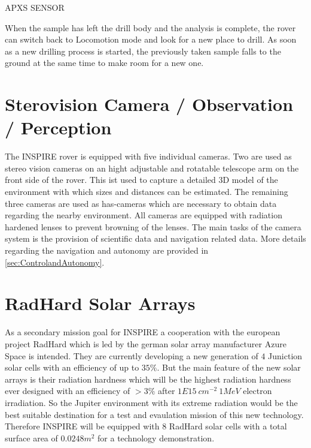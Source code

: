APXS SENSOR

When the sample has left the drill body and the analysis is complete, the rover can switch back to Locomotion mode and look for a new place to drill. As soon as a new drilling process is started, the previously taken sample falls to the ground at the same time to make room for a new one.

\section{Sterovision Camera / Observation / Perception}

The INSPIRE rover is equipped with five individual cameras. Two are used as stereo vision cameras on an hight adjustable and rotatable telescope arm on the front side of the rover. This ist used to capture a detailed 3D model of the environment with which sizes and distances can be estimated. The remaining three cameras are used as has-cameras which are necessary to obtain data regarding the nearby environment. All cameras are equipped with radiation hardened lenses to prevent browning of the lenses. The main tasks of the camera system is the provision of scientific data and navigation related data. More details regarding the navigation and autonomy are provided in \autoref{sec:ControlandAutonomy}.

\section{RadHard Solar Arrays}
\label{subsec:radhard}
As a secondary mission goal for INSPIRE a cooperation with the european project RadHard which is led by the german solar array manufacturer Azure Space is intended. They are currently developing a new generation of $4$ Juniction solar cells with an efficiency of up to $35 \% $. But the main feature of the new solar arrays is their radiation hardness which will be the highest radiation hardness ever designed with an efficiency of $>3 \% $ after $1E15 \ cm^{-2} \ 1MeV$ electron irradiation. So the Jupiter environment with its extreme radiation would be the best suitable destination for a test and evaulation mission of this new technology. Therefore INSPIRE will be equipped with $8$ RadHard solar cells with a total surface area of $0.0248 m^2$ for a technology demonstration\cite{FraunhoferInstituteforSolarEnergySystemsISE.2021}.

